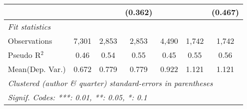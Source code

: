 \begin{tabular}{lcccccc}
                           &               &         & (0.362)     &              &         & (0.467)\\   
   \midrule
   \emph{Fit statistics}\\
   Observations            & 7,301         & 2,853   & 2,853       & 4,490        & 1,742   & 1,742\\  
   Pseudo R$^2$            & 0.46          & 0.54    & 0.55        & 0.45         & 0.55    & 0.56\\  
Mean(Dep. Var.) & 0.672 & 0.779 & 0.779 & 0.922 & 1.121 & 1.121 \\
   \midrule \midrule
   \multicolumn{7}{l}{\emph{Clustered (author \& quarter) standard-errors in parentheses}}\\
   \multicolumn{7}{l}{\emph{Signif. Codes: ***: 0.01, **: 0.05, *: 0.1}}\\
\end{tabular}
\par\endgroup
